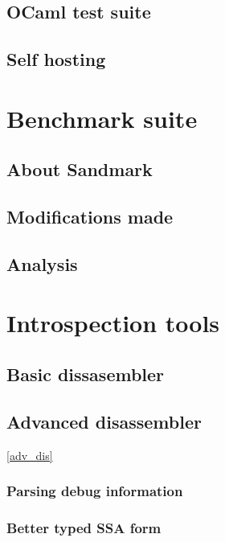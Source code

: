 \subsection{OCaml test suite}

\subsection{Self hosting}

\section{Benchmark suite}

\subsection{About Sandmark}

\subsection{Modifications made}

\subsection{Analysis}

\section{Introspection tools}

\subsection{Basic dissasembler}

\subsection{Advanced disassembler} \ref{adv_dis}

\subsubsection{Parsing debug information}

\subsubsection{Better typed SSA form}